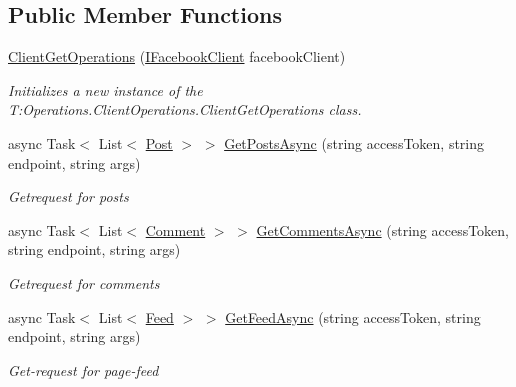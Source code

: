 \subsection*{Public Member Functions}
\begin{DoxyCompactItemize}
\item 
\hyperlink{class_operations_1_1_client_operations_1_1_client_get_operations_acabd2ed7aa053d1d89c1b9b53f78b337}{Client\+Get\+Operations} (\hyperlink{interface_client_1_1_i_facebook_client}{I\+Facebook\+Client} facebook\+Client)
\begin{DoxyCompactList}\small\item\em Initializes a new instance of the T\+:\+Operations.\+Client\+Operations.\+Client\+Get\+Operations class. \end{DoxyCompactList}\item 
async Task$<$ List$<$ \hyperlink{class_data_1_1_facebook_objects_1_1_post}{Post} $>$ $>$ \hyperlink{class_operations_1_1_client_operations_1_1_client_get_operations_a1f9def392f80708b9a8b3aa2ac84c064}{Get\+Posts\+Async} (string access\+Token, string endpoint, string args)
\begin{DoxyCompactList}\small\item\em Getrequest for posts \end{DoxyCompactList}\item 
async Task$<$ List$<$ \hyperlink{class_data_1_1_facebook_objects_1_1_comment}{Comment} $>$ $>$ \hyperlink{class_operations_1_1_client_operations_1_1_client_get_operations_a6b1649b877d56cac75712b90e0acbeae}{Get\+Comments\+Async} (string access\+Token, string endpoint, string args)
\begin{DoxyCompactList}\small\item\em Getrequest for comments \end{DoxyCompactList}\item 
async Task$<$ List$<$ \hyperlink{class_data_1_1_facebook_objects_1_1_feed}{Feed} $>$ $>$ \hyperlink{class_operations_1_1_client_operations_1_1_client_get_operations_acbb66e0b6496c959a3f33a0c08d096ec}{Get\+Feed\+Async} (string access\+Token, string endpoint, string args)
\begin{DoxyCompactList}\small\item\em Get-\/request for page-\/feed \end{DoxyCompactList}\end{DoxyCompactItemize}
